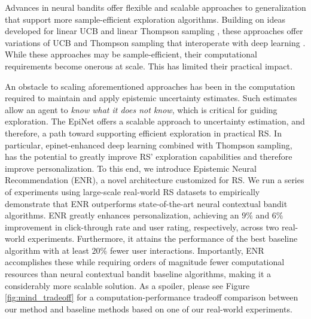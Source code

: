 Advances in neural bandits offer flexible and scalable approaches to generalization that support more sample-efficient exploration algorithms.  Building on ideas developed for linear UCB and linear Thompson sampling \cite{li2010contextual, chapelle2011empirical}, these approaches offer variations of UCB and Thompson sampling that interoperate with deep learning \cite{li2010contextual, zhou2020neural, xu2021neural,abeille2017linear, zhang2021neural, lu2017ensemble,dwaracherla2019hypermodels,OsbandNeuralTestbed,QinEnsembleSampling}.  While these approaches may be sample-efficient, their computational requirements become onerous at scale.  This has limited their practical impact.

An obstacle to scaling aforementioned approaches has been in the computation required to maintain and apply epistemic uncertainty estimates.  Such estimates allow an agent to {\it know what it does not know}, which is critical for guiding exploration.  The EpiNet \cite{osband2021epistemic} offers a scalable approach to uncertainty estimation, and therefore, a path toward supporting efficient exploration in practical RS.  In particular, epinet-enhanced deep learning combined with Thompson sampling, has the potential to greatly improve RS' exploration capabilities and therefore improve personalization. To this end, we introduce Epistemic Neural Recommendation (ENR), a novel architecture customized for RS. We run a series of experiments using large-scale real-world RS datasets to empirically demonstrate that ENR outperforms state-of-the-art neural contextual bandit algorithms. ENR greatly enhances personalization, achieving an $9\%$ and $6\%$ improvement in click-through rate and user rating, respectively, across two real-world experiments. Furthermore, it attains the performance of the best baseline algorithm with at least $20\%$ fewer user interactions. Importantly, ENR accomplishes these while requiring orders of magnitude fewer computational resources than neural contextual bandit baseline algorithms, making it a considerably more scalable solution. As a spoiler, please see Figure \ref{fig:mind_tradeoff} for a computation-performance tradeoff comparison between our method and baseline methods based on one of our real-world experiments.



